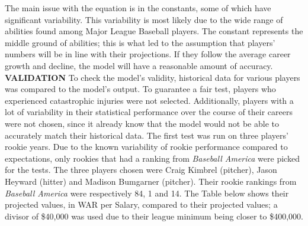 \documentclass[12pt]{article}
\begin{document}
The main issue with the equation is in the constants, some of which have significant variability.  This variability is most likely due to the wide range of abilities found among Major League Baseball players.  The constant represents the middle ground of abilities; this is what led to the assumption that players' numbers will be in line with their projections.  If they follow the average career growth and decline, the model will have a reasonable amount of accuracy.
\vskip 2pt
\textbf{VALIDATION}
\vskip 2pt
To check the model's validity, historical data for various players was compared to the model's output.  To guarantee a fair test, players who experienced catastrophic injuries were not selected.  Additionally, players with a lot of variability in their statistical performance over the course of their careers were not chosen, since it already know that the model would not be able to accurately match their historical data.  The first test was run on three players' rookie years.  Due to the known variability of rookie performance compared to expectations, only rookies that had a ranking from \textit{Baseball America} were picked for the tests.  The three players chosen were Craig Kimbrel (pitcher), Jason Heyward (hitter) and Madison Bumgarner (pitcher).  Their rookie rankings from \textit{Baseball America} were respectively 84, 1 and 14.  The Table below shows their projected values, in WAR per Salary, compared to their projected values; a divisor of \$40,000 was used due to their league minimum being closer to \$400,000.
\end{document}
